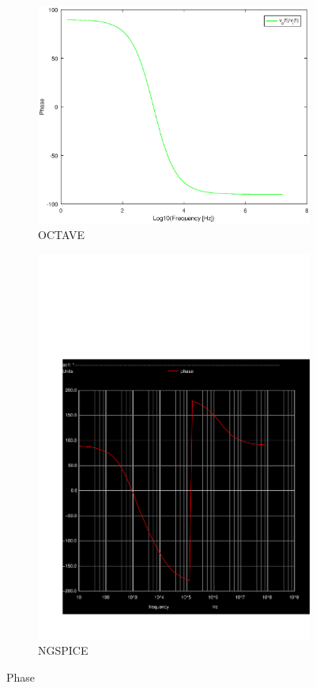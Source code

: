 
\begin{figure}[H] 
\centering
\begin{subfigure}{0.4\textwidth}
\includegraphics[width=\textwidth]{phase.eps}
\caption{OCTAVE}
\label{Octave_phase}
\end{subfigure}
\begin{subfigure}{0.3\textwidth}
\includegraphics[width=\textwidth]{phase.pdf}
\caption{NGSPICE}
\label{Ngspice_phase}
\end{subfigure}
\caption{Phase}
\end{figure}

